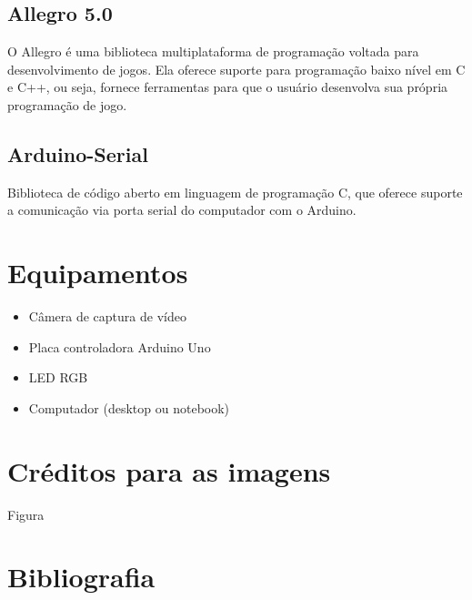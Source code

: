 \documentclass[12pt]{article}
\begin{document}
\subsection{Allegro 5.0}
O Allegro \'e uma biblioteca multiplataforma de programa\c c\~ao voltada para desenvolvimento de jogos. Ela
oferece suporte para programa\c c\~ao baixo n\'ivel em C e C++, ou seja, fornece ferramentas para que o usu\'ario
desenvolva sua pr\'opria programa\c c\~ao de jogo.
\subsection{Arduino-Serial}
Biblioteca de c\'odigo aberto em linguagem de programa\c c\~ao C, que oferece suporte a
comunica\c c\~ao via porta serial do computador com o Arduino.

\section{Equipamentos}
\begin{itemize}
\item C\^amera de captura de v\'ideo
\item Placa controladora Arduino Uno
\item LED RGB
\item Computador (desktop ou notebook)
\end{itemize}

\nocite{*}
\section{Cr\'editos para as imagens}
Figura 

\section{Bibliografia}


\end{document}
